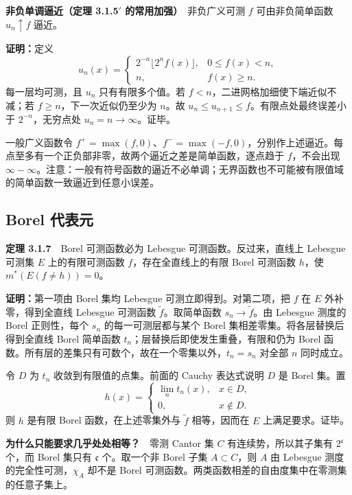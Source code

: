 \documentclass[11pt,a4paper]{article}
\begin{document}
\textbf{非负单调逼近（定理 3.1.5\ensuremath{'} 的常用加强）}　非负广义可测 \(f\)
可由非负简单函数 \(u_n\uparrow f\) 逼近。

\textbf{证明：}定义 \[
u_n(x)=
\begin{cases}
2^{-n}\lfloor2^nf(x)\rfloor,&0\le f(x)<n,\\
n,&f(x)\ge n.
\end{cases}
\] 每一层均可测，且 \(u_n\) 只有有限多个值。若
\(f<n\)，二进网格加细使下端近似不减；若 \(f\ge n\)，下一次近似仍至少为
\(n\)。故 \(u_n\le u_{n+1}\le f\)。有限点处最终误差小于
\(2^{-n}\)，无穷点处 \(u_n=n\to\infty\)。证毕。

一般广义函数令
\(f^+=\max(f,0)\)、\(f^-=\max(-f,0)\)，分别作上述逼近。每点至多有一个正负部非零，故两个逼近之差是简单函数，逐点趋于
\(f\)，不会出现
\(\infty-\infty\)。注意：一般有符号函数的逼近不必单调；无界函数也不可能被有限值域的简单函数一致逼近到任意小误差。

\subsection*{Borel 代表元}\label{borel-ux4ee3ux8868ux5143}

\textbf{定理 3.1.7}　Borel 可测函数必为 Lebesgue
可测函数。反过来，直线上 Lebesgue 可测集 \(E\) 上的有限可测函数
\(f\)，存在全直线上的有限 Borel 可测函数 \(h\)，使
\(m^*(E(f\ne h))=0\)。

\textbf{证明：}第一项由 Borel 集均 Lebesgue 可测立即得到。对第二项，把
\(f\) 在 \(E\) 外补零，得到全直线 Lebesgue 可测函数
\(\widetilde f\)。取简单函数 \(s_n\to\widetilde f\)。由 Lebesgue 测度的
Borel 正则性，每个 \(s_n\) 的每一可测层都与某个 Borel
集相差零集。将各层替换后得到全直线 Borel 简单函数
\(t_n\)；层替换后即使发生重叠，有限和仍为 Borel
函数。所有层的差集只有可数个，故在一个零集以外，\(t_n=s_n\) 对全部 \(n\)
同时成立。

令 \(D\) 为 \(t_n\) 收敛到有限值的点集。前面的 Cauchy 表达式说明 \(D\)
是 Borel 集。置 \[
h(x)=\begin{cases}\lim_n t_n(x),&x\in D,\\0,&x\notin D.\end{cases}
\] 则 \(h\) 是有限 Borel 函数，在上述零集外与 \(\widetilde f\)
相等，因而在 \(E\) 上满足要求。证毕。

\textbf{为什么只能要求几乎处处相等？}　零测 Cantor 集 \(C\)
有连续势，所以其子集有 \(2^{\mathfrak c}\) 个，而 Borel 集只有
\(\mathfrak c\) 个。取一个非 Borel 子集 \(A\subset C\)，则 \(A\) 由
Lebesgue 测度的完全性可测，\(\chi_A\) 却不是 Borel
可测函数。两类函数相差的自由度集中在零测集的任意子集上。
\end{document}
